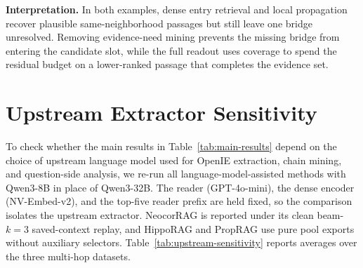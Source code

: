 \noindent\textbf{Interpretation.}
In both examples, dense entry retrieval and local propagation recover
plausible same-neighborhood passages but still leave one bridge
unresolved. Removing evidence-need mining prevents the missing bridge from
entering the candidate slot, while the full readout uses coverage to
spend the residual budget on a lower-ranked passage that completes the
evidence set.

\section{Upstream Extractor Sensitivity}
\label{app:upstream-sensitivity}

To check whether the main results in Table~\ref{tab:main-results}
depend on the choice of upstream language model used for OpenIE
extraction, chain mining, and question-side analysis, we re-run all
language-model-assisted methods with Qwen3-8B in place of Qwen3-32B.
The reader (GPT-4o-mini), the dense encoder (NV-Embed-v2), and the
top-five reader prefix are held fixed, so the comparison isolates the
upstream extractor. NeocorRAG is reported under its clean beam-$k=3$
saved-context replay, and HippoRAG and PropRAG use pure pool exports
without auxiliary selectors. Table~\ref{tab:upstream-sensitivity}
reports averages over the three multi-hop datasets.

\begin{table}[h]
\centering
\small
\setlength{\tabcolsep}{3pt}
\caption{Upstream extractor sensitivity. Multi-hop averages over
HotpotQA, 2WikiMultiHopQA, and MuSiQue under a fixed GPT-4o-mini
reader and NV-Embed-v2 encoder, varying only the upstream language
model used for OpenIE extraction, chain mining, and question-side
analysis. \methodname{} remains the best system in both extractor
configurations.}
\label{tab:upstream-sensitivity}
\end{table}

